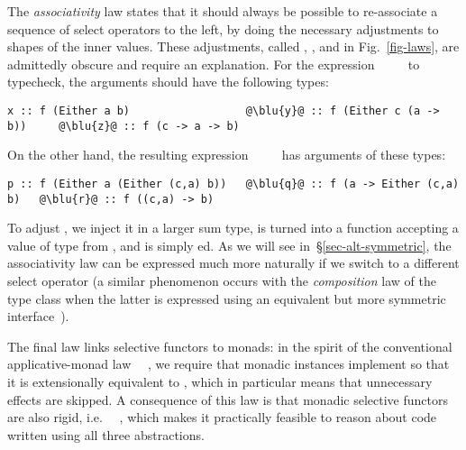 {%

The \emph{associativity} law states that it should always be possible to
re-associate a sequence of select operators to the left, by doing the necessary
adjustments to shapes of the inner values. These adjustments, called ,
, and  in Fig.~\ref{fig-laws}, are admittedly obscure and require an
explanation. For the expression ~~\hs{(}~~ to
typecheck, the arguments should have the following types:

\begin{verbatim}
x :: f (Either a b)                  @\blu{y}@ :: f (Either c (a -> b))     @\blu{z}@ :: f (c -> a -> b)
\end{verbatim}

\noindent
On the other hand, the resulting expression
~~~~ has arguments of these types:

\begin{verbatim}
p :: f (Either a (Either (c,a) b))   @\blu{q}@ :: f (a -> Either (c,a) b)   @\blu{r}@ :: f ((c,a) -> b)
\end{verbatim}

\noindent
To adjust , we inject it in a larger sum type,  is turned into a
function accepting a value of type  from , and  is simply
ed. As we will see in~\S\ref{sec-alt-symmetric}, the associativity
law can be expressed much more naturally if we switch to a different select
operator (a similar phenomenon occurs with the \emph{composition} law of
the  type class when the latter is expressed using an equivalent
but more symmetric  interface~\citep{mcbride2008applicative}).

The final law links selective functors to monads: in the spirit of the
conventional applicative-monad law \hs{(<*>)}~\hs{=}~, we require that
monadic instances implement  so that it is extensionally equivalent
to , which in particular means that unnecessary effects are skipped.
A consequence of this law is that monadic selective functors are also rigid,
i.e. \hs{(<*>)}~\hs{=}~, which makes it practically feasible to reason
about code written using all three abstractions.

}
